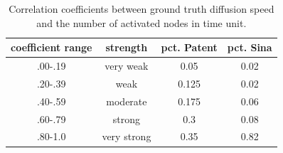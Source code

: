 \begin{table}[H]
\caption{Correlation coefficients between ground truth diffusion speed and the number of activated nodes in time unit.}
\begin{tabular}{c|c|c|c}
 coefficient range & strength & pct. Patent & pct. Sina \\
\hline
.00-.19 & very weak & 0.05 & 0.02\\
.20-.39 & weak & 0.125 & 0.02\\
.40-.59 & moderate & 0.175 & 0.06\\
.60-.79 & strong & 0.3 & 0.08\\
.80-1.0 & very strong & 0.35 & 0.82\\
\end{tabular}\label{tab:Corre}
\end{table}